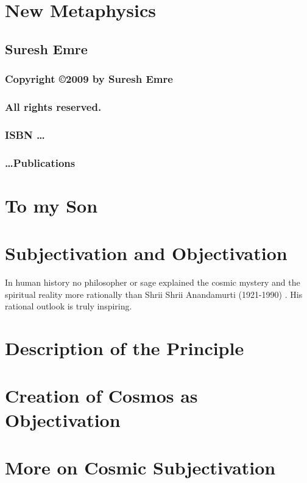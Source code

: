 \documentclass[12pt]{book}
\begin{document}
\frontmatter
%
\chapter*{\Huge \center New Metaphysics }
\thispagestyle{empty}
\section*{\huge \center Suresh Emre}
\newpage
\subsection*{\center \normalsize Copyright \copyright 2009 by Suresh Emre}
\subsection*{\center \normalsize All rights reserved.}
\subsection*{\center \normalsize ISBN \dots}
\subsection*{\center \normalsize \dots Publications}
%
\chapter*{\center \normalsize To my Son}
%
\tableofcontents
%
\mainmatter
%
\chapter{Subjectivation and Objectivation}
In human history no philosopher or sage explained the cosmic mystery and the spiritual reality more rationally than Shrii Shrii Anandamurti (1921-1990) \cite{baba_books} \cite{anandamitra}. His rational outlook is truly inspiring.
%
\chapter{Description of the Principle}
%
\chapter{Creation of Cosmos as Objectivation}
%
\chapter{More on Cosmic Subjectivation}
%
\end{document}
